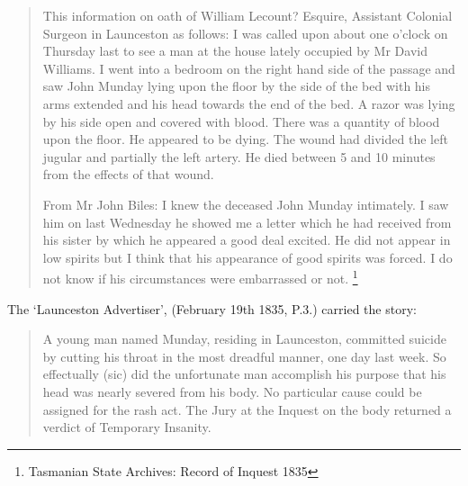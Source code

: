 \begin{quotation}
This information on oath of William Lecount? Esquire, Assistant Colonial Surgeon in Launceston as follows: I was called upon about one o'clock on Thursday last to see a man at the house lately occupied by Mr David Williams. I went into a bedroom on the right hand side of the passage and saw John Munday lying upon the floor by the side of the bed with his arms extended and his head towards the end of the bed. A razor was lying by his side open and covered with blood. There was a quantity of blood upon the floor. He appeared to be dying. The wound had divided the left jugular and partially the left artery. He died between 5 and 10 minutes from the effects of that wound.

From Mr John Biles: I knew the deceased John Munday intimately. I saw him on last Wednesday he showed me a letter which he had received from his sister by which he appeared a good deal excited. He did not appear in low spirits but I think that his appearance of good spirits was forced. I do not know if his circumstances were embarrassed or not. \footnote{Tasmanian State Archives: Record of Inquest 1835}
\end{quotation}

The `Launceston Advertiser', (February 19th 1835, P.3.) carried the story:
\begin{quotation}
A young man named Munday, residing in Launceston, committed suicide by cutting his throat in the most dreadful manner, one day last week. So effectually (sic) did the unfortunate man accomplish his purpose that his head was nearly severed from his body. No particular cause could be assigned for the rash act. The Jury at the Inquest on the body returned a verdict of Temporary Insanity.
\end{quotation}

